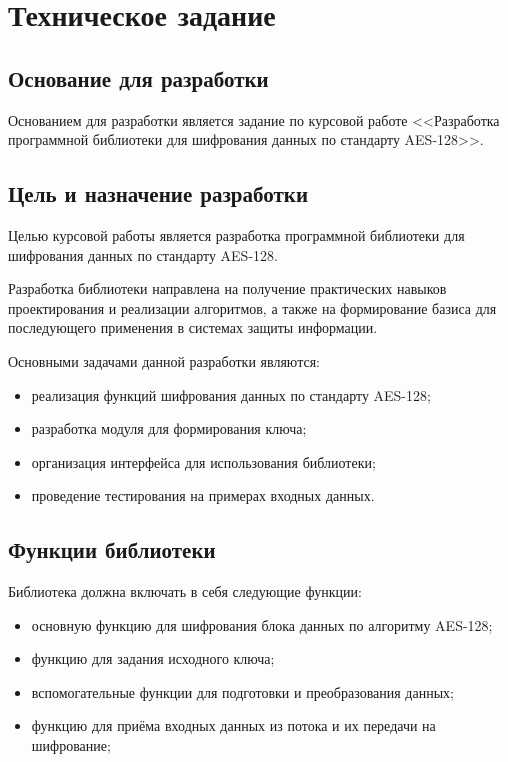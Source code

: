 \section{Техническое задание}
\subsection{Основание для разработки}

Основанием для разработки является задание по курсовой работе 
<<Разработка программной библиотеки для шифрования данных по стандарту AES-128>>. 

\subsection{Цель и назначение разработки}

Целью курсовой работы является разработка программной библиотеки для шифрования данных по стандарту AES-128.  

Разработка библиотеки направлена на получение практических навыков проектирования и реализации  алгоритмов, а также на формирование базиса для последующего применения в системах защиты информации.  

Основными задачами данной разработки являются:
\begin{itemize}
	\item реализация функций шифрования данных по стандарту AES-128;
	 \item разработка модуля для формирования ключа;
	\item организация интерфейса для использования библиотеки;
	\item проведение тестирования на примерах входных данных.
\end{itemize}

\subsection{Функции библиотеки}

Библиотека должна включать в себя следующие функции:
\begin{itemize}
	\item основную функцию для шифрования блока данных по алгоритму AES-128;
	\item функцию для задания исходного ключа;
	\item вспомогательные функции для подготовки и преобразования данных;
	\item функцию для приёма входных данных из потока и их передачи на шифрование;
\end{itemize}


